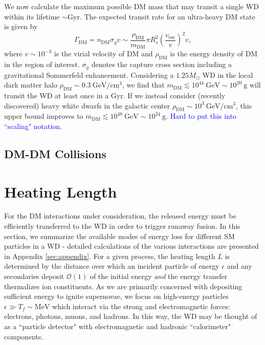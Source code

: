 \documentclass[twocolumn,showpacs,preprintnumbers,amsmath,amssymb,prd]{revtex4}
\newcommand{\OO}{\mathcal{O}}
\newcommand{\GeV}{\text{GeV}}
\def\r{\right)}
\def\l{\left(}
\begin{document}
We now calculate the maximum possible DM mass that may transit a single WD within its lifetime $\sim \text{Gyr}$. The expected transit rate for an ultra-heavy DM state is given by
\begin{equation}
\Gamma_\text{DM} = n_\text{DM} \sigma_g v \sim \frac{\rho_{\text{DM}}}{m_\text{DM}} \pi R_{s}^2 \l\frac{v_\text{esc}}{v}\r^2 v,
\end{equation}
where $v \sim 10^{-3}$ is the virial velocity of DM and $\rho_{\text{DM}}$ is the energy density of DM in the region of interest. $\sigma_g$ denotes the capture cross section including a gravitational Sommerfeld enhancement. Considering a $1.25 M_{\odot}$ WD in the local dark matter halo $\rho_{\text{DM}} \sim 0.3 ~\text{GeV}/\text{cm}^3$, we find that $m_\text{DM} \lesssim 10^{44} ~\GeV \sim 10^{20} ~\text{g}$ will transit the WD at least once in a Gyr. If we instead consider (recently discovered) heavy white dwarfs in the galactic center $\rho_{\text{DM}} \sim 10^3 ~\text{GeV}/\text{cm}^3$, this upper bound improves to $m_\text{DM} \lesssim 10^{48} ~\GeV \sim 10^{24} ~\text{g}$.
\textcolor{blue}{Hard to put this into ``scaling" notation}.

\subsection{DM-DM Collisions}

\section{Heating Length}
\label{sec:heatinglength}
For the DM interactions under consideration, the released energy must be efficiently transferred to the WD in order to trigger runaway fusion. In this section, we summarize the available modes of energy loss for different SM particles in a WD - detailed calculations of the various interactions are presented in Appendix \ref{sec:appendix}. For a given process, the heating length $L$ is determined by the distance over which an incident particle of energy $\epsilon$ and any secondaries deposit $\OO(1)$ of the initial energy \emph{and} the energy transfer thermalizes ion constituents. As we are primarily concerned with depositing sufficient energy to ignite supernovae, we focus on high-energy particles $\epsilon \gg T_f \sim \text{MeV}$ which interact via the strong and electromagnetic forces: electrons, photons, muons, and hadrons. In this way, the WD may be thought of as a ``particle detector" with electromagnetic and hadronic ``calorimeter" components.
\end{document}
